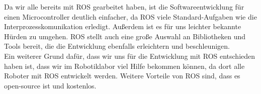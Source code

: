 \begin{flushleft}
    Da wir alle bereits mit ROS gearbeitet haben, ist die Softwareentwicklung für einen Microcontroller deutlich einfacher, da ROS viele Standard-Aufgaben wie die Interprozesskomunikation erledigt. Außerdem ist es für uns leichter bekannte Hürden zu umgehen.
    ROS stellt auch eine große Auswahl an Bibliotheken und Tools bereit, die die Entwicklung ebenfalls erleichtern und beschleunigen.\\
    
    Ein weiterer Grund dafür, dass wir uns für die Entwicklung mit ROS entschieden haben ist, dass wir im Robotiklabor viel Hilfe bekommen können, da dort alle Roboter mit ROS entwickelt werden.
    Weitere Vorteile von ROS sind, dass es open-source ist und kostenlos.

    
\end{flushleft}